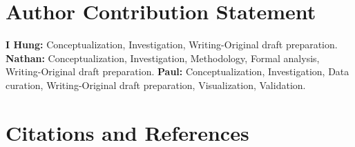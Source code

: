 \documentclass{statsoc}
\begin{document}
\section{Author Contribution Statement}

\textbf{I Hung:} Conceptualization, Investigation, Writing-Original draft preparation. \textbf{Nathan:} Conceptualization, Investigation, Methodology, Formal analysis, Writing-Original draft preparation. \textbf{Paul:} Conceptualization, Investigation, Data curation, Writing-Original draft preparation, Visualization, Validation.

\section{Citations and References}


\end{document}
